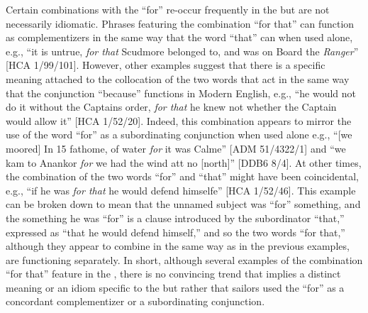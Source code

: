 \addtocounter{footnote}{-2}


Certain combinations with the  “for” re-occur frequently in the  but are not necessarily idiomatic. Phrases featuring the combination “for that” can function as complementizers in the same way that the word “that” can when used alone, e.g., “it is untrue, \textit{for that} Scudmore belonged to, and was on Board the \textit{Ranger}” [HCA 1/99/101]. However, other examples suggest that there is a specific meaning attached to the collocation of the two words that act in the same way that the conjunction “because” functions in Modern English, e.g., “he would not do it without the Captains order, \textit{for that} he knew not whether the Captain would allow it” [HCA 1/52/20]. Indeed, this combination appears to mirror the use of the word “for” as a subordinating conjunction when used alone e.g., “[we moored] In 15 fathome, of water \textit{for} it was Calme” [ADM 51/4322/1] and “we kam to Anankor \textit{for} we had the wind att no [north]” [DDB6 8/4]. At other times, the combination of the two words “for” and “that” might have been coincidental, e.g., “if he was \textit{for that} he would defend himselfe” [HCA 1/52/46]. This example can be broken down to mean that the unnamed subject was “for” something, and the something he was “for” is a clause introduced by the subordinator “that,” expressed as “that he would defend himself,” and so the two words “for that,” although they appear to combine in the same way as in the previous examples, are functioning separately. In short, although several examples of the combination “for that” feature in the , there is no convincing trend that implies a distinct meaning or an idiom specific to the  but rather that sailors used the  “for” as a concordant complementizer or a subordinating conjunction. 

